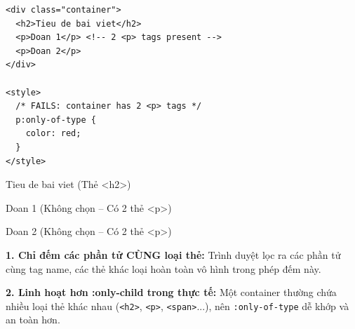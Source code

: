 \documentclass[11pt,oneside]{book}
\newcommand{\thd}[1]{\textcolor{white}{\textbf{\strut #1}}}
\newcommand{\codeinline}[1]{\textcolor{accentOrange}{\texttt{#1}}}
\begin{document}
\begin{codeWindow}
\begin{lstlisting}[language=HTML5]
<div class="container">
  <h2>Tieu de bai viet</h2>
  <p>Doan 1</p> <!-- 2 <p> tags present -->
  <p>Doan 2</p>
</div>

<style>
  /* FAILS: container has 2 <p> tags */
  p:only-of-type {
    color: red;
  }
</style>
\end{lstlisting}
\end{codeWindow}

\begin{browserWindow}
\sffamily\small
Tieu de bai viet {\scriptsize\textcolor{gray!60}{(Thẻ <h2>)}} \par\vspace{2pt}
Doan 1 {\scriptsize\textcolor{gray!60}{(Không chọn -- Có 2 thẻ <p>)}} \par\vspace{2pt}
Doan 2 {\scriptsize\textcolor{gray!60}{(Không chọn -- Có 2 thẻ <p>)}}
\end{browserWindow}

\begin{warnBox}
\textbf{1. Chỉ đếm các phần tử CÙNG loại thẻ:} Trình duyệt lọc ra các phần tử cùng tag name, các thẻ khác loại hoàn toàn vô hình trong phép đếm này.
\par\vspace{4pt}
\textbf{2. Linh hoạt hơn :only-child trong thực tế:} Một container thường chứa nhiều loại thẻ khác nhau (\codeinline{<h2>}, \codeinline{<p>}, \codeinline{<span>}...), nên \codeinline{:only-of-type} dễ khớp và an toàn hơn.
\end{warnBox}

\begin{prettyTableBox}
\sffamily\small
{}
\end{prettyTableBox}
\end{document}
